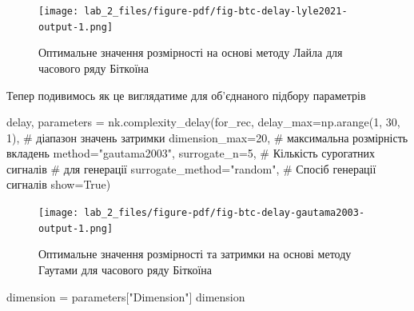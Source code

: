 \documentclass[
  letterpaper,
]{report}
\newenvironment{Shaded}{\begin{snugshade}}{\end{snugshade}}
\newcommand{\CommentTok}[1]{\textcolor[rgb]{0.37,0.37,0.37}{#1}}
\newcommand{\DecValTok}[1]{\textcolor[rgb]{0.68,0.00,0.00}{#1}}
\newcommand{\NormalTok}[1]{\textcolor[rgb]{0.00,0.23,0.31}{#1}}
\newcommand{\OperatorTok}[1]{\textcolor[rgb]{0.37,0.37,0.37}{#1}}
\newcommand{\StringTok}[1]{\textcolor[rgb]{0.13,0.47,0.30}{#1}}
\newcommand{\VariableTok}[1]{\textcolor[rgb]{0.07,0.07,0.07}{#1}}
\begin{document}
\begin{figure}[H]

{\centering \texttt{[image: lab\_2\_files/figure-pdf/fig-btc-delay-lyle2021-output-1.png]}

}

\caption{\label{fig-btc-delay-lyle2021}Оптимальне значення розмірності
на основі методу Лайла для часового ряду Біткоїна}

\end{figure}

Тепер подивимось як це виглядатиме для об'єднаного підбору параметрів

\begin{Shaded}
\begin{Highlighting}[]
\NormalTok{delay, parameters }\OperatorTok{=}\NormalTok{ nk.complexity\_delay(for\_rec,}
\NormalTok{    delay\_max}\OperatorTok{=}\NormalTok{np.arange(}\DecValTok{1}\NormalTok{, }\DecValTok{30}\NormalTok{, }\DecValTok{1}\NormalTok{), }\CommentTok{\# діапазон значень затримки}
\NormalTok{    dimension\_max}\OperatorTok{=}\DecValTok{20}\NormalTok{,              }\CommentTok{\# максимальна розмірність вкладень}
\NormalTok{    method}\OperatorTok{=}\StringTok{"gautama2003"}\NormalTok{,}
\NormalTok{    surrogate\_n}\OperatorTok{=}\DecValTok{5}\NormalTok{,                 }\CommentTok{\# Кількість сурогатних сигналів }
                                   \CommentTok{\# для генерації}
\NormalTok{    surrogate\_method}\OperatorTok{=}\StringTok{"random"}\NormalTok{,     }\CommentTok{\# Спосіб генерації сигналів}
\NormalTok{    show}\OperatorTok{=}\VariableTok{True}\NormalTok{)}
 
\end{Highlighting}
\end{Shaded}

\begin{figure}[H]

{\centering \texttt{[image: lab\_2\_files/figure-pdf/fig-btc-delay-gautama2003-output-1.png]}

}

\caption{\label{fig-btc-delay-gautama2003}Оптимальне значення
розмірності та затримки на основі методу Гаутами для часового ряду
Біткоїна}

\end{figure}

\begin{Shaded}
\begin{Highlighting}[]
\NormalTok{dimension }\OperatorTok{=}\NormalTok{ parameters[}\StringTok{"Dimension"}\NormalTok{]}
\NormalTok{dimension}
\end{Highlighting}
\end{Shaded}
\end{document}
